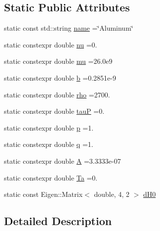 \subsection*{Static Public Attributes}
\begin{DoxyCompactItemize}
\item 
static const std\+::string \hyperlink{structmodel_1_1_periodic_element_3_0113_00_01_isotropic_01_4_a1a62b7ec6064852353108f38a2cbdcf5}{name} =\char`\"{}Aluminum\char`\"{}
\item 
static constexpr double \hyperlink{structmodel_1_1_periodic_element_3_0113_00_01_isotropic_01_4_ac2d3b397eeffc9d99cceea2c4d1098c8}{nu} =0.
\item 
static constexpr double \hyperlink{structmodel_1_1_periodic_element_3_0113_00_01_isotropic_01_4_a5c43eb0974cc0bf646ff57bfa5a6c03e}{mu} =26.\+0e9
\item 
static constexpr double \hyperlink{structmodel_1_1_periodic_element_3_0113_00_01_isotropic_01_4_ac0ba46b421731f53024a2d0bdfb8d823}{b} =0.\+2851e-\/9
\item 
static constexpr double \hyperlink{structmodel_1_1_periodic_element_3_0113_00_01_isotropic_01_4_ad69482015c0afd34be74ffc32beb3241}{rho} =2700.
\item 
static constexpr double \hyperlink{structmodel_1_1_periodic_element_3_0113_00_01_isotropic_01_4_aaef289fd105d9ecc58273229a7d75b4c}{tau\+P} =0.
\item 
static constexpr double \hyperlink{structmodel_1_1_periodic_element_3_0113_00_01_isotropic_01_4_a077e6a309fb301fe06b59bc87f2f13a6}{p} =1.
\item 
static constexpr double \hyperlink{structmodel_1_1_periodic_element_3_0113_00_01_isotropic_01_4_aa21c8bf1bbe6a133bf4d79dfaeebb33f}{q} =1.
\item 
static constexpr double \hyperlink{structmodel_1_1_periodic_element_3_0113_00_01_isotropic_01_4_a9fc1cbf8f50659ed09f138cae9070f36}{A} =3.\+3333e-\/07
\item 
static constexpr double \hyperlink{structmodel_1_1_periodic_element_3_0113_00_01_isotropic_01_4_aba667693957fd32fe44ef7334aa20dc4}{Ta} =0.
\item 
static const Eigen\+::\+Matrix$<$ double, 4, 2 $>$ \hyperlink{structmodel_1_1_periodic_element_3_0113_00_01_isotropic_01_4_a90e4f24781a40aacc68fd794232a841e}{d\+H0}
\end{DoxyCompactItemize}


\subsection{Detailed Description}

